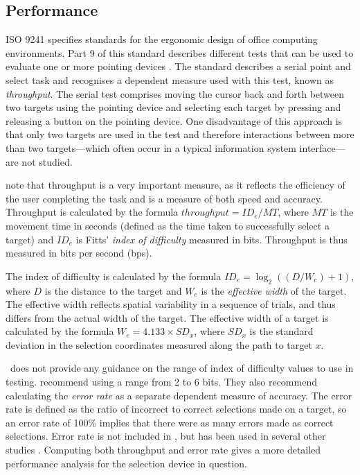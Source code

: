 \documentclass[a4paper]{article}
\begin{document}
\subsection{Performance}
\label{sec-evaluation-performance}

ISO 9241 specifies standards for the ergonomic design of office
computing environments. Part 9 of this standard describes different
tests that can be used to evaluate one or more pointing devices
\citep{ISO-2000-9241-9}. The standard describes a serial point and
select task and recognises a dependent measure used with this test,
known as \emph{throughput}. The serial test comprises moving the cursor
back and forth between two targets using the pointing device and
selecting each target by pressing and releasing a button on the pointing
device. One disadvantage of this approach is that only two targets are
used in the test and therefore interactions between more than two
targets---which often occur in a typical information system
interface---are not studied.

\citet{Mack-IS-2001-EHCI} note that throughput is a very important
measure, as it reflects the efficiency of the user completing the task
and is a measure of both speed and accuracy. Throughput is calculated by
the formula \(\mathit{throughput} = \mathit{ID}_{e} / \mathit{MT}\),
where \(\mathit{MT}\) is the movement time in seconds (defined as the
time taken to successfully select a target) and \(\mathit{ID}_{e}\) is
Fitts' \citeyearpar{Fitt-PM-1954-Law} \emph{index of difficulty}
measured in bits. Throughput is thus measured in bits per second (bps).

The index of difficulty is calculated by the formula \(\mathit{ID}_{e} =
\log_{2}((D / W_{e}) + 1)\), where \(D\) is the distance to the target
and \(W_{e}\) is the \emph{effective width} of the target. The effective
width reflects spatial variability in a sequence of trials, and thus
differs from the actual width of the target. The effective width of a
target is calculated by the formula \(W_{e} = 4.133 \times
\mathit{SD}_{x}\), where \(\mathit{SD}_{x}\) is the standard deviation
in the selection coordinates measured along the path to target \(x\).

\ISOnine\ does not provide any guidance on the range of index of
difficulty values to use in testing. \citet{Doug-SA-1999-CHI} recommend
using a range from 2 to 6 bits. They also recommend calculating the
\emph{error rate} as a separate dependent measure of accuracy. The
error rate is defined as the ratio of incorrect to correct selections
made on a target, so an error rate of 100\% implies that there were as
many errors made as correct selections. Error rate is not included in
\ISOnine, but has been used in several other studies
\citep{Sear-A-1991-IJMMS,Sear-A-1993-BIT,Hara-H-1996,Bend-G-1999-PhD,
Doug-SA-1999-CHI,Mack-IS-2001-EHCI,Po-BA-2004-CHI}. Computing both
throughput and error rate gives a more detailed performance analysis for
the selection device in question.
\end{document}
